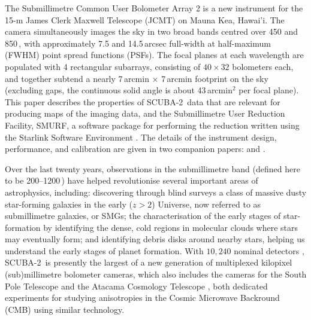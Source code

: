 \documentclass[useAMS,usenatbib,nofootinbib]{mn2e}
\newcommand{\scuba}{SCUBA-2}
\begin{document}
The Submillimetre Common User Bolometer Array 2
\citep[\scuba,][]{holland2012} is a new instrument for the 15-m James
Clerk Maxwell Telescope (JCMT) on Mauna Kea, Hawai'i. The camera
simultaneously images the sky in two broad bands centred over 450 and
850\,\micron, with approximately 7.5 and 14.5\,arcsec full-width at
half-maximum (FWHM) point spread functions (PSFs). The focal planes at
each wavelength are populated with 4 rectangular subarrays, consisting
of $40 \times 32$ bolometers each, and together subtend a nearly
7\,arcmin $\times$ 7\,arcmin footprint on the sky (excluding gaps, the
continuous solid angle is about 43\,arcmin$^{2}$ per focal plane).
This paper describes the properties of \scuba\ data that are relevant
for producing maps of the imaging data, and the Submillimetre User
Reduction Facility, SMURF, a software package for performing the
reduction written using the Starlink Software Environment
\citep{1993ASPC...52..229W,2009ASPC..411..418J}. The details of the instrument design,
performance, and calibration are given in two companion papers:
\citet{holland2012} and \citet{dempsey2012}.

Over the last twenty years, observations in the submillimetre band
(defined here to be 200--1200\,\micron) have helped revolutionise
several important areas of astrophysics, including: discovering
through blind surveys a class of massive dusty star-forming galaxies
in the early ($z>2$) Universe, now referred to as submillimetre
galaxies, or SMGs; the characterisation of the early stages of
star-formation by identifying the dense, cold regions in molecular
clouds where stars may eventually form; and identifying debris disks
around nearby stars, helping us understand the early stages of planet
formation.  With $10,240$ nominal detectors \citep[of which $\sim$69\%
work and are typically useful,][]{holland2012}, \scuba\ is presently
the largest of a new generation of multiplexed kilopixel
(sub)millimetre bolometer cameras, which also includes the cameras for
the South Pole Telescope \citep[SPT,][]{carlstrom2011} and the Atacama
Cosmology Telescope \citep[ACT,][]{swetz2011}, both dedicated
experiments for studying anisotropies in the Cosmic Microwave
Backround (CMB) using similar technology.
\end{document}
